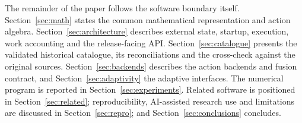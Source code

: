 The remainder of the paper follows the software boundary itself.
Section~\ref{sec:math} states the common mathematical representation and
action algebra.  Section~\ref{sec:architecture} describes external state,
startup, execution, work accounting and the release-facing API.
Section~\ref{sec:catalogue} presents the validated historical catalogue, its
reconciliations and the cross-check against the original sources.
Section~\ref{sec:backends} describes the action backends and fusion contract,
and Section~\ref{sec:adaptivity} the adaptive interfaces.  The numerical
program is reported in Section~\ref{sec:experiments}.  Related software is
positioned in Section~\ref{sec:related}; reproducibility, AI-assisted research
use and limitations are discussed in Section~\ref{sec:repro}; and
Section~\ref{sec:conclusions} concludes.
